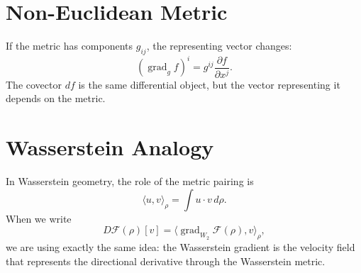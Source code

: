 \documentclass[11pt]{article}
\begin{document}
\section*{Non-Euclidean Metric}

If the metric has components $g_{ij}$, the representing vector changes:
\[
(\operatorname{grad}_g f)^i
=
g^{ij}\frac{\partial f}{\partial x^j}.
\]
The covector $df$ is the same differential object, but the vector representing
it depends on the metric.

\section*{Wasserstein Analogy}

In Wasserstein geometry, the role of the metric pairing is
\[
\langle u,v\rangle_\rho
=
\int u\cdot v\,d\rho.
\]
When we write
\[
D\mathcal F(\rho)[v]
=
\langle \operatorname{grad}_{W_2}\mathcal F(\rho),v\rangle_\rho,
\]
we are using exactly the same idea: the Wasserstein gradient is the velocity
field that represents the directional derivative through the Wasserstein
metric.
\end{document}
